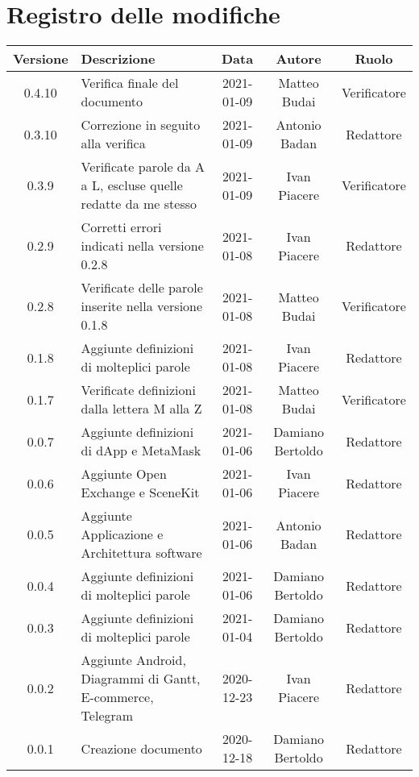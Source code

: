 \section*{Registro delle modifiche}

\begin{center}
	\begin{longtable}{|c|p{5cm}|c|c|c|}
	\hline
	\rowcolor{lighter-grayer}
	\textbf{Versione} & \textbf{Descrizione} & \textbf{Data} & \textbf{Autore} & \textbf{Ruolo} \\
	\hline
	\endfirsthead

	0.4.10 & Verifica finale del documento & 2021-01-09 & Matteo Budai & Verificatore \\
	\hline
	0.3.10 & Correzione in seguito alla verifica & 2021-01-09 & Antonio Badan & Redattore \\
	\hline
	0.3.9 & Verificate parole da A a L, escluse quelle redatte da me stesso & 2021-01-09 & Ivan Piacere & Verificatore \\
	\hline
	0.2.9 & Corretti errori indicati nella versione 0.2.8 & 2021-01-08 & Ivan Piacere & Redattore \\
	\hline
	0.2.8 & Verificate delle parole inserite nella versione 0.1.8 & 2021-01-08 & Matteo Budai & Verificatore \\
	\hline
	0.1.8 & Aggiunte definizioni di molteplici parole & 2021-01-08 & Ivan Piacere & Redattore \\
	\hline
	0.1.7 & Verificate definizioni dalla lettera M alla Z & 2021-01-08 & Matteo Budai & Verificatore \\
	\hline
	0.0.7 & Aggiunte definizioni di dApp e MetaMask & 2021-01-06 & Damiano Bertoldo & Redattore \\
	\hline
	0.0.6 & Aggiunte Open Exchange e SceneKit & 2021-01-06 & Ivan Piacere & Redattore \\
	\hline
	0.0.5 & Aggiunte Applicazione e Architettura software & 2021-01-06 & Antonio Badan & Redattore \\
	\hline
	0.0.4 & Aggiunte definizioni di molteplici parole & 2021-01-06 & Damiano Bertoldo & Redattore \\
	\hline
	0.0.3 & Aggiunte definizioni di molteplici parole & 2021-01-04 & Damiano Bertoldo & Redattore \\
	\hline
	0.0.2 & Aggiunte Android, Diagrammi di Gantt, E-commerce, Telegram & 2020-12-23 & Ivan Piacere & Redattore \\
	\hline
	0.0.1 & Creazione documento & 2020-12-18 & Damiano Bertoldo & Redattore \\
	\hline

	\end{longtable}
\end{center}
